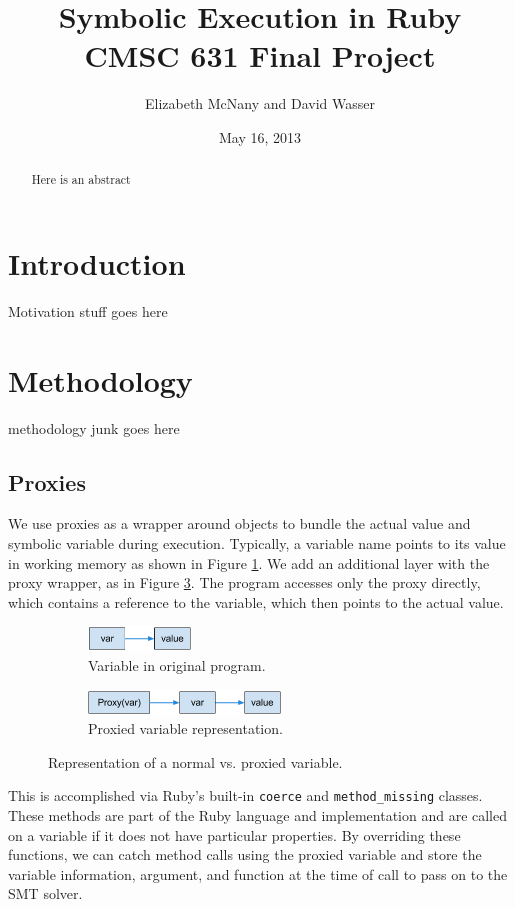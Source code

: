 \documentclass[10pt]{article}
\title{Symbolic Execution in Ruby\\
CMSC 631 Final Project}
\author{Elizabeth McNany and David Wasser}
\date{May 16, 2013}
\begin{document}
\maketitle

\begin{abstract}
Here is an abstract
\end{abstract}

\section{Introduction}
Motivation stuff goes here \cite{typeinf} \cite{rails}

\section{Methodology}
methodology junk goes here

\subsection{Proxies}
We use proxies as a wrapper around objects to bundle the actual value and symbolic variable during execution.  Typically, a variable name points to its value in working memory as shown in Figure \ref{pointer:1}.  We add an additional layer with the proxy wrapper, as in Figure \ref{pointer:2}.  The program accesses only the proxy directly, which contains a reference to the variable, which then points to the actual value.

\begin{figure}
  \centering
  \begin{subfigure}{0.5\textwidth}
	\centering
	\includegraphics[height=25px]{pointer1.png}
	\caption{Variable in original program.}
	\label{pointer:1}
  \end{subfigure}\begin{subfigure}{0.5\textwidth}
	\centering
	\includegraphics[height=25px]{pointer2.png}
	\caption{Proxied variable representation.}
	\label{pointer:2}
  \end{subfigure}
  \caption{Representation of a normal vs. proxied variable.}
\end{figure}

This is accomplished via Ruby's built-in \texttt{coerce} and \texttt{method\_missing} classes.  These methods are part of the Ruby language and implementation and are called on a variable if it does not have particular properties.  By overriding these functions, we can catch method calls using the proxied variable and store the variable information, argument, and function at the time of call to pass on to the SMT solver.\\
\end{document}
